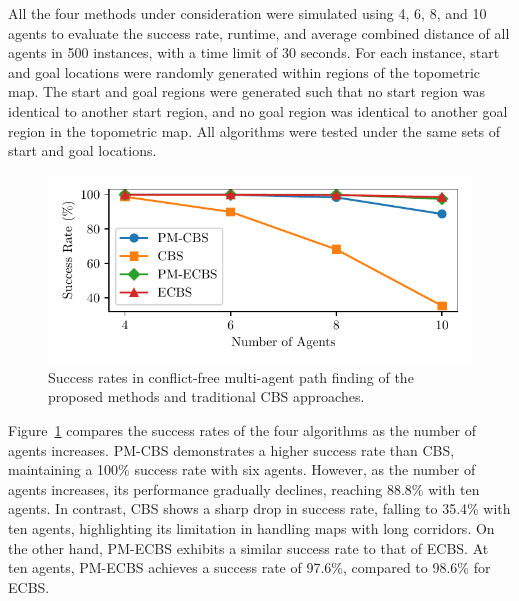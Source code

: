 \documentclass[letterpaper, 10 pt, conference]{ieeeconf}  %
\begin{document}
All the four methods under consideration were simulated using 4, 6, 8, and 10 agents to evaluate the success rate, runtime, and average combined distance of all agents in 500 instances, with a time limit of 30 seconds. For each instance, start and goal locations were randomly generated within regions of the topometric map. The start and goal regions were generated such that no start region was identical to another start region, and no goal region was identical to another goal region in the topometric map. All algorithms were tested under the same sets of start and goal locations.

\begin{figure}[t]
    \centering
    \includegraphics[width=.8\linewidth]{result/success_rate.pdf}
    \caption{Success rates in conflict-free multi-agent path finding of the proposed methods and traditional CBS approaches.}
    \label{fig:success}
\end{figure}
Figure~\ref{fig:success} compares the success rates of the four algorithms as the number of agents increases. PM-CBS demonstrates a higher success rate than CBS, maintaining a 100\% success rate with six agents. However, as the number of agents increases, its performance gradually declines, reaching 88.8\% with ten agents. In contrast, CBS shows a sharp drop in success rate, falling to 35.4\% with ten agents, highlighting its limitation in handling maps with long corridors. On the other hand, PM-ECBS exhibits a similar success rate to that of ECBS. At ten agents, PM-ECBS achieves a success rate of 97.6\%, compared to 98.6\% for ECBS.
\end{document}
